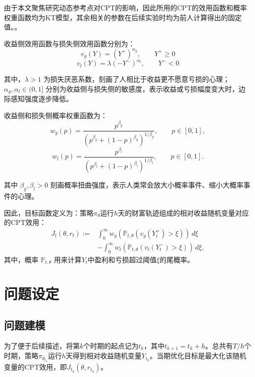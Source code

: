 \documentclass{sufethesismas}
\begin{document}
由于本文聚焦研究动态参考点对CPT的影响，因此所用的CPT的效用函数和概率权重函数均为KT模型，其余相关的参数在后续实验时均为前人计算得出的固定值。\citep{kahneman1979prospect}。

收益侧效用函数与损失侧效用函数分别为：
\begin{equation}
v_g(Y)
=(Y^+)^{\alpha_g},
\qquad
Y^+\ge 0
\end{equation}
\begin{equation}
v_l(Y)
=\lambda (-Y^-)^{\alpha_l},  
\qquad
Y^-<0
\end{equation}

其中，$\lambda>1$ 为损失厌恶系数，刻画了人相比于收益更不愿意亏损的心理；$\alpha_g,\alpha_l\in(0,1]$ 分别为收益侧与损失侧的敏感度，表示收益或亏损幅度变大时，边际感知强度逐步降低。

收益侧和损失侧概率权重函数为：
\begin{equation}
 w_g(p)=\frac{p^{\beta_g}}{\left(p^{\beta_g}+(1-p)^{\beta_g}\right)^{1/\beta_g}},\qquad p\in[0,1],
\end{equation}
\begin{equation}
 w_l(p)=\frac{p^{\beta_l}}{\left(p^{\beta_l}+(1-p)^{\beta_l}\right)^{1/\beta_l}},\qquad p\in[0,1].
\end{equation}

其中 $\beta_g,\beta_l>0$ 刻画概率扭曲强度，表示人类常会放大小概率事件、缩小大概率事件的心理。

因此，目标函数定义为：策略$\pi_{\theta}$运行$h$天的财富轨迹组成的相对收益随机变量对应的CPT效用：
\begin{equation}
\label{eq:cpt_objective}
\begin{aligned}
J_t(\theta,r_t)
:=&\int_0^\infty w_g\!\left(\mathbb{P}_{t,\theta}\left(v_g(Y_t^+)>\xi\right)\right)\,d\xi \\
&-\int_0^\infty  w_l\!\left(\mathbb{P}_{t,\theta}\left(v_l(Y_t^-)>\xi\right)\right)\,d\xi,
\end{aligned}
\end{equation}
其中，概率 $\mathbb{P}_{t,\theta}$ 用来计算$Y_t$中盈利和亏损超过阈值$\xi$的尾概率。
\section{问题设定}
\subsection{问题建模}
为了便于后续描述，将第$k$个时期的起点记为$t_k$，其中$t_{k+1}=t_k+h$。总共有$T/h$个时期，策略$\pi_{\theta_{t_k}}$运行$h$天得到相对收益随机变量$Y_{t_k}$。当期优化目标是最大化该随机变量的CPT效用，即$J_{t_k}(\theta,r_{t_k})$。
\end{document}
